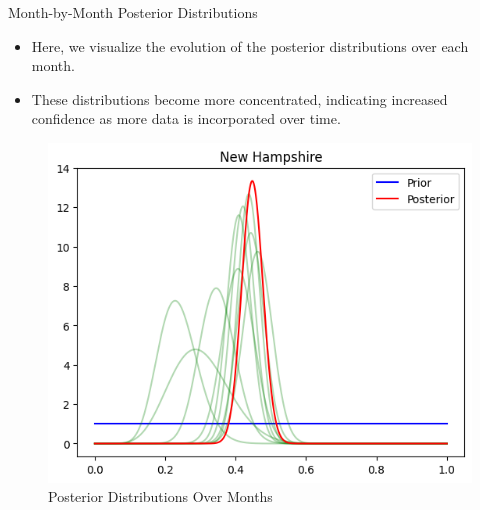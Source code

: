 \begin{frame}{Month-by-Month Posterior Distributions}

  \begin{itemize}
    \item Here, we visualize the evolution of the posterior distributions over each month.
    \item These distributions become more concentrated, indicating increased confidence as more data is incorporated over time.
  \end{itemize}

\begin{figure}
  \centering
  \includegraphics[width=.6\linewidth]{../Report/images/posterior-years.png}
  \caption{Posterior Distributions Over Months}
\end{figure}

  
\end{frame}

